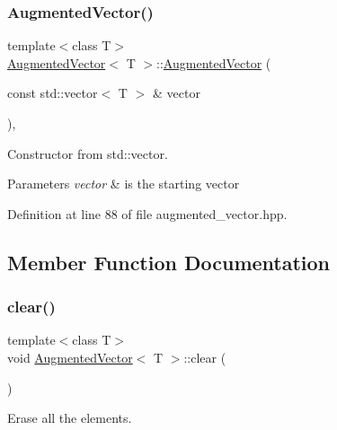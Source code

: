 \subsubsection{\texorpdfstring{Augmented\+Vector()}{AugmentedVector()}\hspace{0.1cm}{\footnotesize\ttfamily [4/4]}}
{\footnotesize\ttfamily template$<$class T$>$ \\
\hyperlink{classAugmentedVector}{Augmented\+Vector}$<$ T $>$\+::\hyperlink{classAugmentedVector}{Augmented\+Vector} (\begin{DoxyParamCaption}\item[{const std\+::vector$<$ T $>$ \&}]{vector }\end{DoxyParamCaption})\hspace{0.3cm}{\ttfamily [inline]}, {\ttfamily [explicit]}}



Constructor from std\+::vector. 


\begin{DoxyParams}{Parameters}
{\em vector} & is the starting vector \\
\hline
\end{DoxyParams}


Definition at line 88 of file augmented\+\_\+vector.\+hpp.



\subsection{Member Function Documentation}
\mbox{\label{classAugmentedVector_ae793c7d0f31d40be20c10450c7b2fec6}} 
\subsubsection{\texorpdfstring{clear()}{clear()}}
{\footnotesize\ttfamily template$<$class T$>$ \\
void \hyperlink{classAugmentedVector}{Augmented\+Vector}$<$ T $>$\+::clear (\begin{DoxyParamCaption}{ }\end{DoxyParamCaption})\hspace{0.3cm}{\ttfamily [inline]}}



Erase all the elements. 



